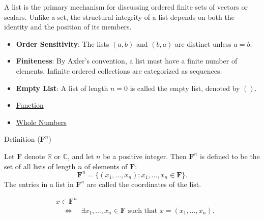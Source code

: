 \begin{remark*}[Interpretation]
A list is the primary mechanism for discussing ordered finite sets of vectors or scalars. Unlike a set, the structural integrity of a list depends on both the identity and the position of its members.
\begin{itemize}
    \item \textbf{Order Sensitivity}: The lists $(a, b)$ and $(b, a)$ are distinct unless $a=b$.
    \item \textbf{Finiteness}: By Axler's convention, a list must have a finite number of elements. Infinite ordered collections are categorized as sequences.
    \item \textbf{Empty List}: A list of length $n=0$ is called the empty list, denoted by $()$.
\end{itemize}
\end{remark*}

\begin{dependencies}
\begin{itemize}
  \item \hyperref[def:function]{Function}
  \item \hyperref[def:whole-numbers]{Whole Numbers}
\end{itemize}
\end{dependencies}

\begin{definitionbox}{Definition ($\mathbf{F}^n$)}
\begin{definition}[$\mathbf{F}^n$]
\label{def:fn}
Let $\mathbf{F}$ denote $\mathbb{R}$ or $\mathbb{C}$, and let $n$ be a positive integer.
Then $\mathbf{F}^n$ is defined to be the set of all lists of length $n$ of elements of $\mathbf{F}$:
\[
\mathbf{F}^n
=
\{(x_1,\dots,x_n) : x_1,\dots,x_n \in \mathbf{F}\}.
\]
The entries in a list in $\mathbf{F}^n$ are called the coordinates of the list.
\end{definition}
\end{definitionbox}

\begin{remark*}
\[
\begin{aligned}
&x \in \mathbf{F}^n \\
&\quad\Longleftrightarrow\quad
\exists x_1,\dots,x_n \in \mathbf{F}
\text{ such that }
x = (x_1,\dots,x_n).
\end{aligned}
\]
\end{remark*}

